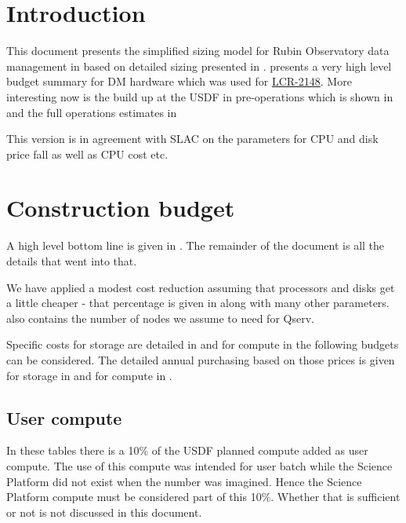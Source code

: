 \section{Introduction}
This document presents the simplified
  sizing model for Rubin Observatory data management  in  based on detailed sizing presented in .
 presents a very high level budget summary for
DM hardware which was used for \href{https://project.lsst.org/groups/ccb/node/3889}{LCR-2148}.
More interesting now is the build up at the USDF in pre-operations which is shown in 
and the full operations estimates in 

This version is in agreement with SLAC on the parameters for CPU and disk price fall as well as CPU cost etc.

\section{Construction  budget}\label{sec:cost}

A high level bottom line is given in .
The remainder of the document is all the details that went into that.



We have applied a modest cost reduction assuming that processors  and disks get a little cheaper - that
percentage is given in  along with many other parameters.  also contains the number of nodes we assume to need for Qserv.

Specific  costs for storage are detailed in  and for compute in 
the following budgets can be considered. The detailed annual purchasing based on those prices is given for
storage in  and for compute in .

\subsection{User compute}
In these tables there is a 10\%  of the USDF planned compute added as user compute.
The use of this compute was intended for user batch while the Science Platform did not exist when the number was imagined.
Hence the Science Platform compute must be considered part of this 10\%.
Whether that is sufficient or not is not discussed in this document.


